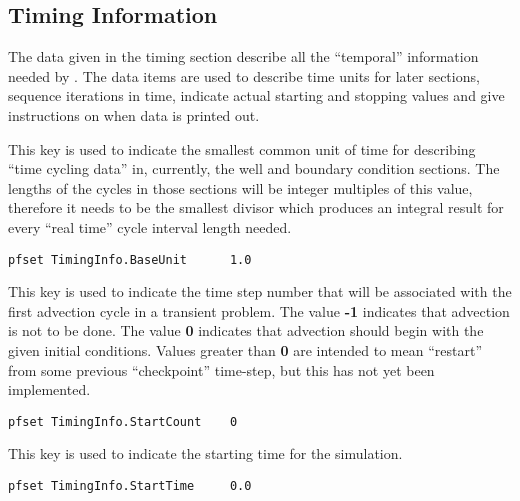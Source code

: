 
\subsection{Timing Information}
\label{Timing Information}

The data given in the timing section describe all the ``temporal''
information needed by \parflow{}.  The data items are used to
describe time units for later sections, sequence iterations in time,
indicate actual starting and stopping values and give instructions
on when data is printed out.

{
This key is used to indicate the smallest common unit of time for
describing ``time cycling data'' in, currently, the well and boundary
condition sections.  The lengths of the cycles in those sections will be
integer multiples of this value, therefore it needs to be the smallest
divisor which produces an integral result for every ``real time'' cycle
interval length needed.
}
\begin{display}\begin{verbatim}
pfset TimingInfo.BaseUnit      1.0
\end{verbatim}\end{display}

{
This key is used to indicate the time step number that will be associated
with the first advection cycle in a transient problem.  The value
{\bf -1} indicates that advection is not to be done.  The value {\bf 0}
indicates that advection should begin with the given initial conditions.
Values greater than {\bf 0} are intended to mean ``restart'' from some
previous ``checkpoint'' time-step, but this has not yet been implemented.
}
\begin{display}\begin{verbatim}
pfset TimingInfo.StartCount    0
\end{verbatim}\end{display}

{
This key is used to indicate the starting time for the simulation.
}
\begin{display}\begin{verbatim}
pfset TimingInfo.StartTime     0.0
\end{verbatim}\end{display}

